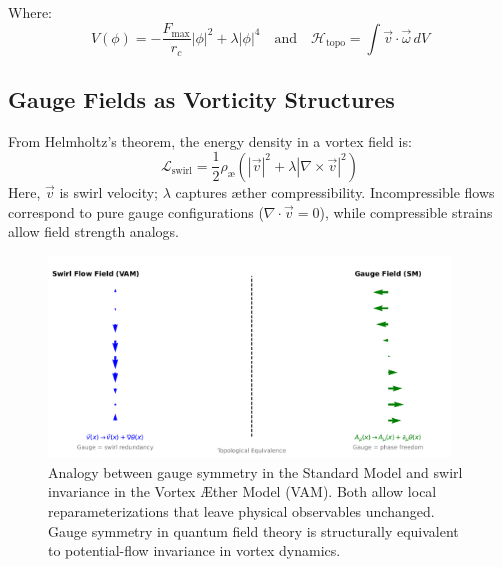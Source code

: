 Where:
\[
    V(\phi) = -\frac{F_\text{max}}{r_c}|\phi|^2 + \lambda |\phi|^4
    \quad \text{and} \quad \mathcal{H}_\text{topo} = \int \vec{v} \cdot \vec{\omega} \, dV
\]

\subsection{Gauge Fields as Vorticity Structures}
From Helmholtz’s theorem, the energy density in a vortex field is:
\begin{equation}
    \mathcal{L}_{\text{swirl}} = \frac{1}{2} \rho_\text{\ae} \left( |\vec{v}|^2 + \lambda |\nabla \times \vec{v}|^2 \right)
\end{equation}
Here, $\vec{v}$ is swirl velocity; $\lambda$ captures æther compressibility. Incompressible flows correspond to pure gauge configurations ($\nabla \cdot \vec{v} = 0$), while compressible strains allow field strength analogs.

\begin{figure}[H]
    \centering
    \includegraphics[width=0.95\textwidth]{gauge_swirl_equivalence}
    \caption{Analogy between gauge symmetry in the Standard Model and swirl invariance in the Vortex Æther Model (VAM). Both allow local reparameterizations that leave physical observables unchanged. Gauge symmetry in quantum field theory is structurally equivalent to potential-flow invariance in vortex dynamics.}
    \label{fig:gauge_swirl_equivalence}
\end{figure}

